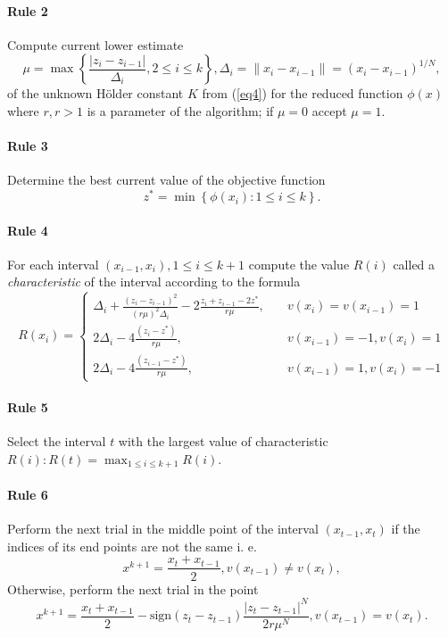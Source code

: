 \documentclass[runningheads]{llncs}
\begin{document}
\paragraph{Rule 2} Compute current lower estimate
\begin{equation}\label{eq7} 
\mu = \max\left\{ \frac{|z_i-z_{i-1}|}{\Delta _i}, 2 \leq i \leq k \right\} , \Delta _i= \| x_i -x_{i-1} \| =(x_i-x_{i-1})^{1/N},
\end{equation}
of the unknown H{\"o}lder constant $K$ from (\ref{eq4}) for the reduced function $\phi(x)$ where $r, r>1$ is a parameter of the algorithm; if $\mu=0$ accept $\mu=1$.
\paragraph{Rule 3} Determine the best current value of the objective function
\begin{equation}\label{eq8} 
z^*=\min \left\{ \phi (x_i): 1\leq i \leq k \right\}.
\end{equation}

\paragraph{Rule 4} For each interval $(x_{i-1},x_i),1 \leq i \leq k+1$ compute the value $R(i)$ called a \textit{characteristic} of the interval according to the formula
\begin{equation}\label{eq9} 
R(x_i)=
  \begin{cases}
    \Delta _i+\frac {{(z_i-z_{i-1})}^2}{{(r \mu)}^2 \Delta _i} - 2 \frac {z_i+z_{i-1}-2z^*}{r \mu}, & {\quad  v(x_i)=v(x_{i-1})=1}\\
    2 \Delta _i-4 \frac {(z_i-z^*)}{r \mu}, & {\quad  v(x_{i-1})=-1, v(x_i)=1}\\
    2 \Delta _i-4 \frac {(z_{i-1}-z^*)}{r \mu}, & {\quad  v(x_{i-1})=1, v(x_i)=-1}
  \end{cases}
\end{equation}

\paragraph{Rule 5} Select the interval $t$ with the largest value of characteristic $R(i):R(t)= \max_{1 \leq i \leq k+1} R(i)$.

\paragraph{Rule 6} Perform the next trial in the middle point of the interval $(x_{t-1},x_t)$ if the indices of its end points are not the same i. e.
\begin{equation}\label{eq10} 
x^{k+1}=\frac {x_t+x_{t-1}}{2}, v(x_{t-1})\neq v(x_t),
\end{equation}
Otherwise, perform the next trial in the point
\begin{equation}\label{eq11} 
x^{k+1}= \frac {x_t+x_{t-1}}{2} -  \text{sign} {(z_t-z_{t-1})} \frac {{|z_t-z_{t-1}|}^N}{2r \mu ^N}, v(x_{t-1})=v(x_t).
\end{equation}
\end{document}
